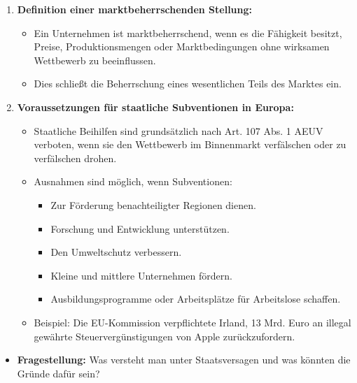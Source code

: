 {\begin{enumerate}[label=(\alph*)]
    \item \textbf{Definition einer marktbeherrschenden Stellung:}
    \begin{itemize}
        \item Ein Unternehmen ist marktbeherrschend, wenn es die Fähigkeit besitzt, Preise, Produktionsmengen oder Marktbedingungen ohne wirksamen Wettbewerb zu beeinflussen.
        \item Dies schließt die Beherrschung eines wesentlichen Teils des Marktes ein.
    \end{itemize}

    \item \textbf{Voraussetzungen für staatliche Subventionen in Europa:}
    \begin{itemize}
        \item Staatliche Beihilfen sind grundsätzlich nach Art. 107 Abs. 1 AEUV verboten, wenn sie den Wettbewerb im Binnenmarkt verfälschen oder zu verfälschen drohen.
        \item Ausnahmen sind möglich, wenn Subventionen:
        \begin{itemize}
            \item Zur Förderung benachteiligter Regionen dienen.
            \item Forschung und Entwicklung unterstützen.
            \item Den Umweltschutz verbessern.
            \item Kleine und mittlere Unternehmen fördern.
            \item Ausbildungsprogramme oder Arbeitsplätze für Arbeitslose schaffen.
        \end{itemize}
        \item Beispiel: Die EU-Kommission verpflichtete Irland, 13 Mrd. Euro an illegal gewährte Steuervergünstigungen von Apple zurückzufordern.
    \end{itemize}
\end{enumerate}
}
\begin{itemize}
    \item \textbf{Fragestellung:} Was versteht man unter Staatsversagen und was könnten die Gründe dafür sein?
\end{itemize}

